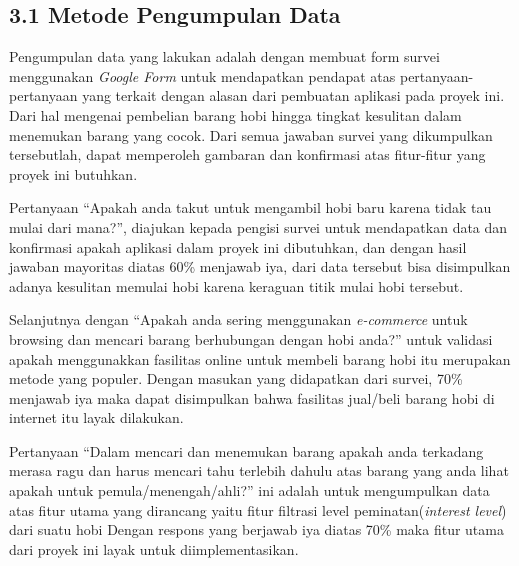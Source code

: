 \documentclass[a4paper]{article}
\begin{document}
\subsection*{3.1 Metode Pengumpulan Data}


Pengumpulan data yang lakukan adalah dengan membuat form survei menggunakan \textit{Google Form} untuk mendapatkan pendapat atas pertanyaan-pertanyaan yang terkait dengan alasan dari pembuatan aplikasi pada proyek ini. Dari hal mengenai pembelian barang hobi hingga tingkat kesulitan dalam menemukan barang yang cocok. Dari semua jawaban survei yang dikumpulkan tersebutlah, dapat memperoleh gambaran dan konfirmasi atas fitur-fitur yang proyek ini butuhkan.


Pertanyaan “Apakah anda takut untuk mengambil hobi baru karena tidak tau mulai dari mana?”, diajukan kepada pengisi survei untuk mendapatkan data dan konfirmasi apakah aplikasi dalam proyek ini dibutuhkan, dan dengan hasil jawaban mayoritas diatas 60\% menjawab iya, dari data tersebut bisa disimpulkan adanya kesulitan memulai hobi karena keraguan titik mulai hobi tersebut.


Selanjutnya dengan “Apakah anda sering menggunakan \textit{e-commerce} untuk browsing dan mencari barang berhubungan dengan hobi anda?” untuk validasi apakah menggunakkan fasilitas online untuk membeli barang hobi itu merupakan metode yang populer. Dengan masukan yang didapatkan dari survei, 70\% menjawab iya maka dapat disimpulkan bahwa fasilitas jual/beli barang hobi di internet itu layak dilakukan.


Pertanyaan “Dalam mencari dan menemukan barang apakah anda terkadang merasa ragu dan harus mencari tahu terlebih dahulu atas barang yang anda lihat apakah untuk pemula/menengah/ahli?” ini adalah untuk mengumpulkan data atas fitur utama yang dirancang yaitu fitur filtrasi level peminatan(\textit{interest level}) dari suatu hobi Dengan respons yang berjawab iya diatas 70\% maka fitur utama dari proyek ini layak untuk diimplementasikan.


\end{document}
